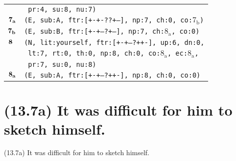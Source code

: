 \documentclass{article}
\begin{document}
\begin{minipage}{\textwidth}
{\begin{tabular}{|r|l|}
    & \texttt{\texttt{~pr:4,~su:8,~nu:7)}} \\
    ${\textbf{\textrm{7}}_{\textbf{\textrm{a}}}}$ & \texttt{\texttt{(E,~sub:A,~ftr:[+-+-??+--],~np:7,~ch:0,~co:${\textrm{7}_{\textrm{b}}}$)}} \\
    ${\textbf{\textrm{7}}_{\textbf{\textrm{b}}}}$ & \texttt{\texttt{(E,~sub:B,~ftr:[+-+--?+--],~np:7,~ch:${\textrm{8}_{\textrm{a}}}$,~co:0)}} \\
    ${\textbf{\textrm{8}}_{\phantom{z}}}$ & \texttt{\texttt{(N,~lit:yourself,~ftr:[+-+--?++-],~up:6,~dn:0,}} \\
    & \texttt{\texttt{~lt:7,~rt:0,~th:0,~np:8,~ch:0,~co:${\textrm{8}_{\textrm{a}}}$,~ec:${\textrm{8}_{\textrm{a}}}$,}} \\
    & \texttt{\texttt{~pr:7,~su:0,~nu:8)}} \\
    ${\textbf{\textrm{8}}_{\textbf{\textrm{a}}}}$ & \texttt{\texttt{(E,~sub:A,~ftr:[+-+--?++-],~np:8,~ch:0,~co:0)}} \\
    \hline
  \end{tabular}
  }
\end{minipage}
\bigbreak

\clearpage

%
%

\section*{(13.7a) It was difficult for him to sketch himself.}

\bigbreak
\begin{enumerate*}
\item[(13.7a)] It was difficult for him to sketch himself.
\end{enumerate*}
\bigbreak
\end{document}
